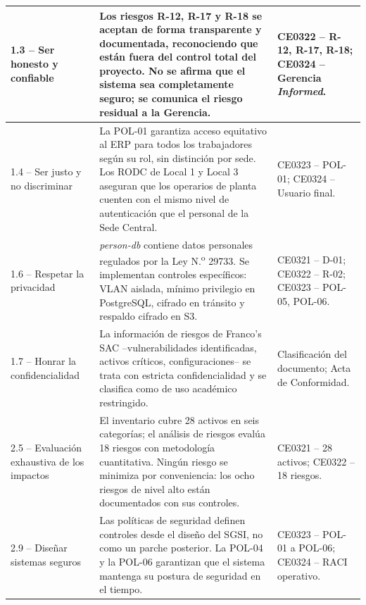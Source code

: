 \documentclass[11pt, a4paper, oneside]{report}
\begin{document}
\begin{xltabular}{\textwidth}{@{}|L{3.6cm}|X|L{3.4cm}|@{}}
{\small 1.3 -- Ser honesto y confiable} & {\small Los riesgos R-12, R-17 y R-18 se aceptan de forma transparente y documentada, reconociendo que están fuera del control total del proyecto. No se afirma que el sistema sea completamente seguro; se comunica el riesgo residual a la Gerencia.} & {\small CE0322 -- R-12, R-17, R-18; CE0324 -- Gerencia \textit{Informed}.} \\ \hline

{\small 1.4 -- Ser justo y no discriminar} & {\small La POL-01 garantiza acceso equitativo al ERP para todos los trabajadores según su rol, sin distinción por sede. Los RODC de Local 1 y Local 3 aseguran que los operarios de planta cuenten con el mismo nivel de autenticación que el personal de la Sede Central.} & {\small CE0323 -- POL-01; CE0324 -- Usuario final.} \\ \hline

{\small 1.6 -- Respetar la privacidad} & {\small \textit{person-db} contiene datos personales regulados por la Ley N.\textsuperscript{o} 29733. Se implementan controles específicos: VLAN aislada, mínimo privilegio en PostgreSQL, cifrado en tránsito y respaldo cifrado en S3.} & {\small CE0321 -- D-01; CE0322 -- R-02; CE0323 -- POL-05, POL-06.} \\ \hline

{\small 1.7 -- Honrar la confidencialidad} & {\small La información de riesgos de Franco's SAC --vulnerabilidades identificadas, activos críticos, configuraciones-- se trata con estricta confidencialidad y se clasifica como de uso académico restringido.} & {\small Clasificación del documento; Acta de Conformidad.} \\ \hline

{\small 2.5 -- Evaluación exhaustiva de los impactos} & {\small El inventario cubre 28 activos en seis categorías; el análisis de riesgos evalúa 18 riesgos con metodología cuantitativa. Ningún riesgo se minimiza por conveniencia: los ocho riesgos de nivel alto están documentados con sus controles.} & {\small CE0321 -- 28 activos; CE0322 -- 18 riesgos.} \\ \hline

{\small 2.9 -- Diseñar sistemas seguros} & {\small Las políticas de seguridad definen controles desde el diseño del SGSI, no como un parche posterior. La POL-04 y la POL-06 garantizan que el sistema mantenga su postura de seguridad en el tiempo.} & {\small CE0323 -- POL-01 a POL-06; CE0324 -- RACI operativo.} \\ \hline

\end{xltabular}
\end{document}
